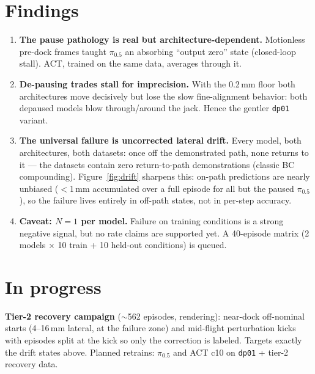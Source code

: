 \documentclass[11pt]{article}
\begin{document}
\section{Findings}
\begin{enumerate}\itemsep2pt
  \item \textbf{The pause pathology is real but architecture-dependent.} Motionless
        pre-dock frames taught $\pi_{0.5}$ an absorbing ``output zero'' state
        (closed-loop stall). ACT, trained on the same data, averages through it.
  \item \textbf{De-pausing trades stall for imprecision.} With the 0.2\,mm floor both
        architectures move decisively but lose the slow fine-alignment behavior:
        both depaused models blow through/around the jack. Hence the gentler
        \texttt{dp01} variant.
  \item \textbf{The universal failure is uncorrected lateral drift.} Every model, both
        architectures, both datasets: once off the demonstrated path, none returns
        to it --- the datasets contain zero return-to-path demonstrations
        (classic BC compounding). Figure~\ref{fig:drift} sharpens this: on-path
        predictions are nearly unbiased ($<$1\,mm accumulated over a full episode
        for all but the paused $\pi_{0.5}$), so the failure lives entirely in
        off-path states, not in per-step accuracy.
  \item \textbf{Caveat: $N{=}1$ per model.} Failure on training conditions is a
        strong negative signal, but no rate claims are supported yet. A 40-episode
        matrix (2 models $\times$ 10 train + 10 held-out conditions) is queued.
\end{enumerate}

\section{In progress}
\textbf{Tier-2 recovery campaign} ($\sim$562 episodes, rendering): near-dock
off-nominal starts (4--16\,mm lateral, at the failure zone) and mid-flight
perturbation kicks with episodes split at the kick so only the correction is
labeled. Targets exactly the drift states above. Planned retrains: $\pi_{0.5}$
and ACT c10 on \texttt{dp01} + tier-2 recovery data.
\end{document}
